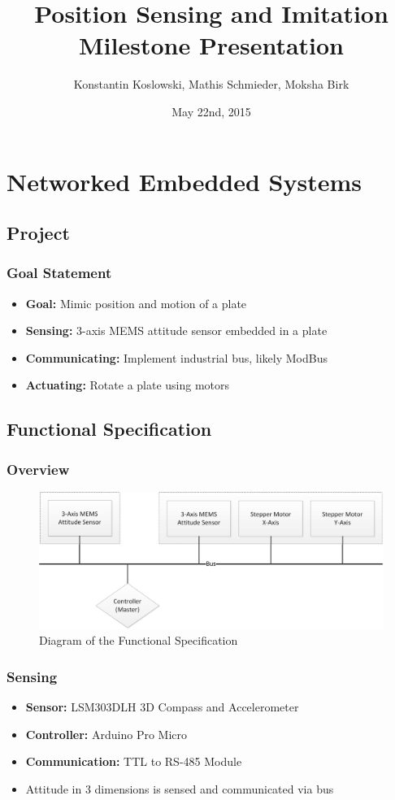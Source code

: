 \documentclass{beamer}
\title[NES Project: Milestone Presentation]{Position Sensing and Imitation\\Milestone Presentation}
\author[Koslowski, Schmieder, Birk]{Konstantin Koslowski, Mathis Schmieder, Moksha Birk}
\institute[]
{TU Berlin \\
 Department of Telecommunication Systems \\
 Telecommunication Networks Group \\
}
\date{May 22nd, 2015}
\begin{document}
\begin{frame}
  \titlepage
\end{frame}

\section{Networked Embedded Systems}
\subsection{Project}

\begin{frame}
  \frametitle{Goal Statement}
	\begin{itemize}
		\item \textbf{Goal:} Mimic position and motion of a plate
		\vfill
		\item \textbf{Sensing:} 3-axis MEMS attitude sensor embedded in a plate
		\item \textbf{Communicating:} Implement industrial bus, likely ModBus
		\item \textbf{Actuating:} Rotate a plate using motors
	\end{itemize}
\end{frame}

\subsection{Functional Specification}
\begin{frame}
  \frametitle{Overview}
\begin{figure}
\includegraphics[width=\textwidth]{functionalspecification.pdf} 
\caption{Diagram of the Functional Specification}
\end{figure}
\end{frame}

\begin{frame}
	\frametitle{Sensing}
	\begin{itemize}
		\item \textbf{Sensor:} LSM303DLH 3D Compass and Accelerometer
		\item \textbf{Controller:} Arduino Pro Micro
		\item \textbf{Communication:} TTL to RS-485 Module
		\item Attitude in 3 dimensions is sensed and communicated via bus
	\end{itemize}
\end{frame}
\end{document}
